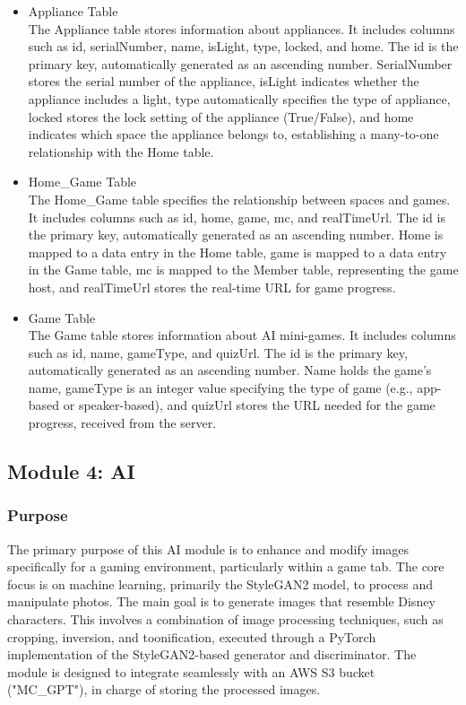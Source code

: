 \documentclass[conference]{IEEEtran}
\begin{document}
\begin{itemize}
                \vspace{3mm}                
                \item Appliance Table\\
                The Appliance table stores information about appliances. It includes columns such as id, serialNumber, name, isLight, type, locked, and home. The id is the primary key, automatically generated as an ascending number. SerialNumber stores the serial number of the appliance, isLight indicates whether the appliance includes a light, type automatically specifies the type of appliance, locked stores the lock setting of the appliance (True/False), and home indicates which space the appliance belongs to, establishing a many-to-one relationship with the Home table.
                \vspace{3mm}                
                \item Home\_Game Table\\
                The Home\_Game table specifies the relationship between spaces and games. It includes columns such as id, home, game, mc, and realTimeUrl. The id is the primary key, automatically generated as an ascending number. Home is mapped to a data entry in the Home table, game is mapped to a data entry in the Game table, mc is mapped to the Member table, representing the game host, and realTimeUrl stores the real-time URL for game progress.
                \vspace{3mm}                
                \item Game Table\\
                The Game table stores information about AI mini-games. It includes columns such as id, name, gameType, and quizUrl. The id is the primary key, automatically generated as an ascending number. Name holds the game's name, gameType is an integer value specifying the type of game (e.g., app-based or speaker-based), and quizUrl stores the URL needed for the game progress, received from the server.
            \end{itemize}
    \subsection{Module 4: AI}
        \subsubsection{Purpose}
            The primary purpose of this AI module is to enhance and modify images specifically for a gaming environment, particularly within a game tab. The core focus is on machine learning, primarily the StyleGAN2 model, to process and manipulate photos. The main goal is to generate images that resemble Disney characters. This involves a combination of image processing techniques, such as cropping, inversion, and toonification, executed through a PyTorch implementation of the StyleGAN2-based generator and discriminator. The module is designed to integrate seamlessly with an AWS S3 bucket ("MC\_GPT"), in charge of storing the processed images.\\
            \vspace{3mm}
\end{document}
